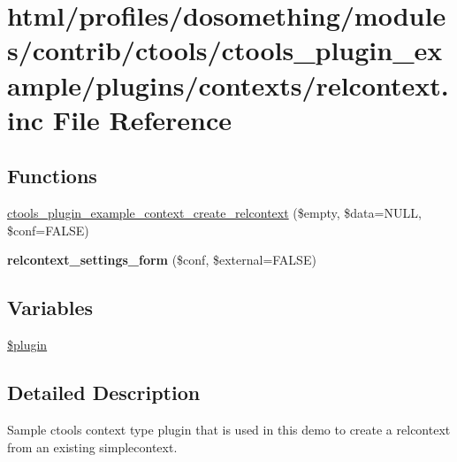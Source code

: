 \hypertarget{relcontext_8inc}{
\section{html/profiles/dosomething/modules/contrib/ctools/ctools\_\-plugin\_\-example/plugins/contexts/relcontext.inc File Reference}
\label{relcontext_8inc}
}
\subsection*{Functions}
\begin{DoxyCompactItemize}
\item 
\hyperlink{relcontext_8inc_a2956388149c8e389a959757769f67767}{ctools\_\-plugin\_\-example\_\-context\_\-create\_\-relcontext} (\$empty, \$data=NULL, \$conf=FALSE)
\item 
\hypertarget{relcontext_8inc_ad7592aa196f7f4282491b8236d2dcd64}{
{\bfseries relcontext\_\-settings\_\-form} (\$conf, \$external=FALSE)}
\label{relcontext_8inc_ad7592aa196f7f4282491b8236d2dcd64}

\end{DoxyCompactItemize}
\subsection*{Variables}
\begin{DoxyCompactItemize}
\item 
\hyperlink{relcontext_8inc_ada8a7130088351710bb02ed622d6bf65}{\$plugin}
\end{DoxyCompactItemize}


\subsection{Detailed Description}
Sample ctools context type plugin that is used in this demo to create a relcontext from an existing simplecontext. 

